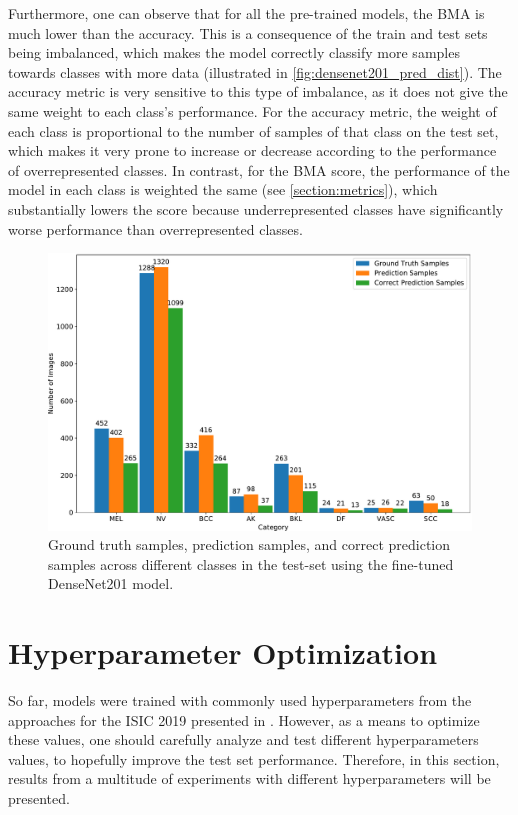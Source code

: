     Furthermore, one can observe that for all the pre-trained models, the \ac{BMA} is much lower than the accuracy. This is a consequence of the train and test sets being imbalanced, which makes the model correctly classify more samples towards classes with more data (illustrated in \autoref{fig:densenet201_pred_dist}). The accuracy metric is very sensitive to this type of imbalance, as it does not give the same weight to each class's performance. For the accuracy metric, the weight of each class is proportional to the number of samples of that class on the test set, which makes it very prone to increase or decrease according to the performance of overrepresented classes. In contrast, for the \ac{BMA} score, the performance of the model in each class is weighted the same (see \cref{section:metrics}), which substantially lowers the score because underrepresented classes have significantly worse performance than overrepresented classes. \par
    \begin{figure}[ht]
        \centering
        \includegraphics[width=\textwidth]{figs/densenet201_pred_dist.pdf}
        \caption{Ground truth samples, prediction samples, and correct prediction samples across different classes in the test-set using the fine-tuned DenseNet201 model.}
        \label{fig:densenet201_pred_dist}
    \end{figure}

\section{Hyperparameter Optimization} \label{section:hyperparameters}
    So far, models were trained with commonly used hyperparameters from the approaches for the \ac{ISIC} 2019 presented in . However, as a means to optimize these values, one should carefully analyze and test different hyperparameters values, to hopefully improve the test set performance. Therefore, in this section, results from a multitude of experiments with different hyperparameters will be presented. \par
    
